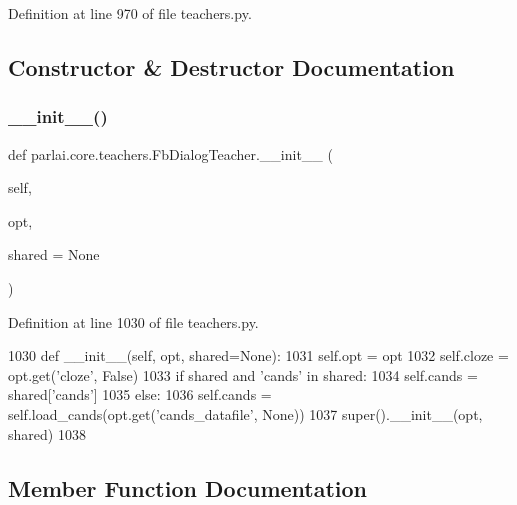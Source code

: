Definition at line 970 of file teachers.\+py.



\subsection{Constructor \& Destructor Documentation}
\mbox{\label{classparlai_1_1core_1_1teachers_1_1FbDialogTeacher_a52316baa31ca0881d4cd98ec2fbebad5}} 
\subsubsection{\texorpdfstring{\+\_\+\+\_\+init\+\_\+\+\_\+()}{\_\_init\_\_()}}
{\footnotesize\ttfamily def parlai.\+core.\+teachers.\+Fb\+Dialog\+Teacher.\+\_\+\+\_\+init\+\_\+\+\_\+ (\begin{DoxyParamCaption}\item[{}]{self,  }\item[{}]{opt,  }\item[{}]{shared = {\ttfamily None} }\end{DoxyParamCaption})}



Definition at line 1030 of file teachers.\+py.


\begin{DoxyCode}
1030     \textcolor{keyword}{def }\_\_init\_\_(self, opt, shared=None):
1031         self.opt = opt
1032         self.cloze = opt.get(\textcolor{stringliteral}{'cloze'}, \textcolor{keyword}{False})
1033         \textcolor{keywordflow}{if} shared \textcolor{keywordflow}{and} \textcolor{stringliteral}{'cands'} \textcolor{keywordflow}{in} shared:
1034             self.cands = shared[\textcolor{stringliteral}{'cands'}]
1035         \textcolor{keywordflow}{else}:
1036             self.cands = self.load\_cands(opt.get(\textcolor{stringliteral}{'cands\_datafile'}, \textcolor{keywordtype}{None}))
1037         super().\_\_init\_\_(opt, shared)
1038 
\end{DoxyCode}


\subsection{Member Function Documentation}
\mbox{\label{classparlai_1_1core_1_1teachers_1_1FbDialogTeacher_ab3ff2f1a0707aae7bf888fb13ec49641}} 

